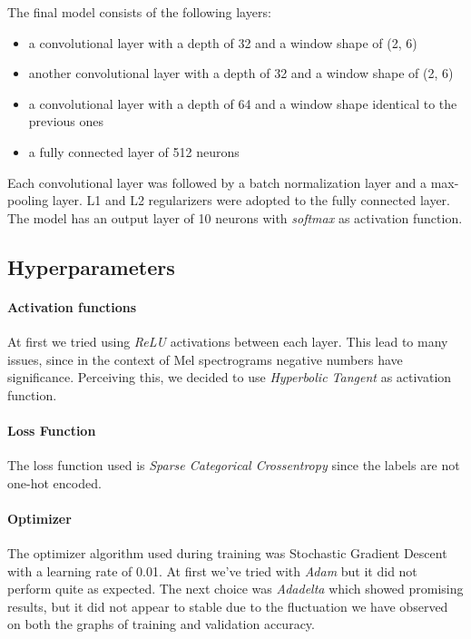 \documentclass{article}
\begin{document}
The final model consists of the following layers: 

\begin{itemize}
\item a convolutional layer with a depth of 32 and a window shape of (2, 6)
\item another convolutional layer with a depth of 32 and a window shape of (2, 6)
\item a convolutional layer with a depth of 64 and a window shape identical to the previous ones
\item a fully connected layer of 512 neurons
\end{itemize}

Each convolutional layer was followed by a batch normalization 
layer and a max-pooling layer. L1 and L2 regularizers were adopted to the fully connected layer. 
The model has an output layer of 10 neurons with \emph{softmax} as activation function. 

\subsection{Hyperparameters}
\paragraph{Activation functions}
At first we tried using \emph{ReLU} activations between each layer. This lead to many issues, 
since in the context of Mel spectrograms negative numbers have significance. Perceiving this, 
we decided to use \emph{Hyperbolic Tangent} as activation function.

\paragraph{Loss Function}
The loss function used is \emph{Sparse Categorical Crossentropy} since the labels are not one-hot encoded. 

\paragraph{Optimizer}
The optimizer algorithm used during training was Stochastic Gradient Descent with a learning rate of 0.01. 
At first we've tried with \emph{Adam} but it did not perform quite as expected. The next choice 
was \emph{Adadelta} which showed promising results, but it did not appear to stable due to the 
fluctuation we have observed on both the graphs of training and validation accuracy. 
\end{document}
